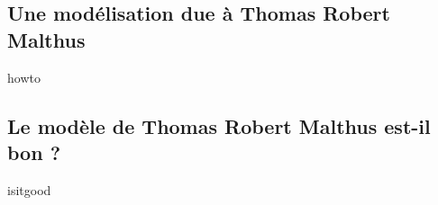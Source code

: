 \subsection{Une modélisation due à Thomas Robert Malthus}
\label{malthus-model}

{howto}



\subsection{Le modèle de Thomas Robert Malthus est-il bon ?}
\label{malthus-isitgood}

{isitgood}

